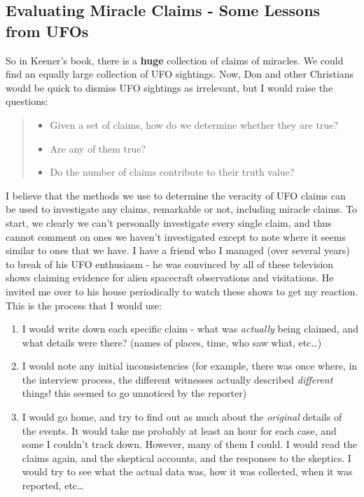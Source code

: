 \subsection{Evaluating Miracle Claims - Some Lessons from
UFOs}\label{pandoc-evaluating-miracle-claims---some-lessons-from-ufos}

So in Keener's book, there is a \textbf{huge} collection of claims of
miracles. We could find an equally large collection of UFO sightings.
Now, Don and other Christians would be quick to dismiss UFO sightings as
irrelevant, but I would raise the questions:

\begin{quote}
\begin{itemize}
\itemsep1pt\parskip0pt
\item
  Given a set of claims, how do we determine whether they are true?
\item
  Are any of them true?
\item
  Do the number of claims contribute to their truth value?
\end{itemize}
\end{quote}

I believe that the methods we use to determine the veracity of UFO
claims can be used to investigate any claims, remarkable or not,
including miracle claims. To start, we clearly we can't personally
investigate every single claim, and thus cannot comment on ones we
haven't investigated except to note where it seems similar to ones that
we have. I have a friend who I managed (over several years) to break of
his UFO enthusiasm - he was convinced by all of these television shows
claiming evidence for alien spacecraft observations and visitations. He
invited me over to his house periodically to watch these shows to get my
reaction. This is the process that I would use:

\begin{enumerate}
\def\labelenumi{\arabic{enumi}.}
\itemsep1pt\parskip0pt
\item
  I would write down each specific claim - what was \emph{actually}
  being claimed, and what details were there? (names of places, time,
  who saw what, etc\ldots{})
\item
  I would note any initial inconsistencies (for example, there was once
  where, in the interview process, the different witnesses actually
  described \emph{different} things! this seemed to go unnoticed by the
  reporter)
\item
  I would go home, and try to find out as much about the \emph{original}
  details of the events. It would take me probably at least an hour for
  each case, and some I couldn't track down. However, many of them I
  could. I would read the claims again, and the skeptical accounts, and
  the responses to the skeptics. I would try to see what the actual data
  was, how it was collected, when it was reported, etc\ldots{}
\end{enumerate}


